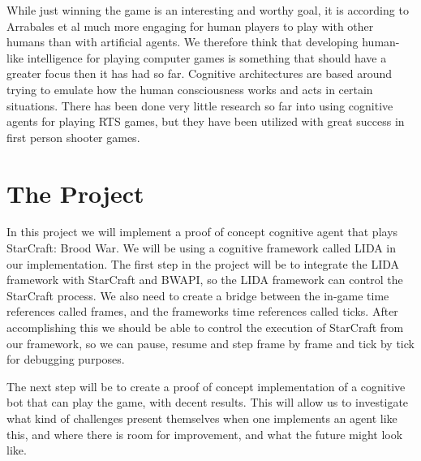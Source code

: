 While just winning the game is an interesting and worthy goal, it is according to Arrabales et al much more engaging for human players to play with other humans than with artificial agents.\cite{arrabales2009gamechars} We therefore think that developing human-like intelligence for playing computer games is something that should have a greater focus then it has had so far. Cognitive architectures are based around trying to emulate how the human consciousness works and acts in certain situations. There has been done very little research so far into using cognitive agents for playing RTS games, but they have been utilized with great success in first person shooter games.\cite{arrabales2009gamechars}

\section{The Project}
In this project we will implement a proof of concept cognitive agent that plays StarCraft: Brood War. We will be using a cognitive framework called LIDA in our implementation. The first step in the project will be to integrate the LIDA framework with StarCraft and BWAPI, so the LIDA framework can control the StarCraft process. We also need to create a bridge between the in-game time references called frames, and the frameworks time references called ticks. After accomplishing this we should be able to control the execution of StarCraft from our framework, so we can pause, resume and step frame by frame and tick by tick for debugging purposes.

The next step will be to create a proof of concept implementation of a cognitive bot that can play the game, with decent results. This will allow us to investigate what kind of challenges present themselves when one implements an agent like this, and where there is room for improvement, and what the future might look like.

